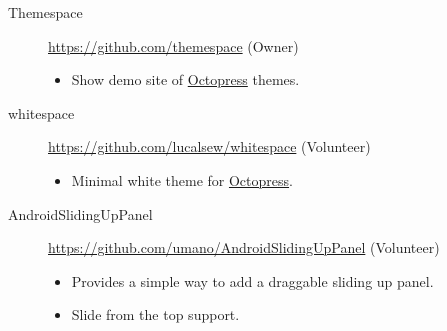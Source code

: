 \documentclass[a4paper,10pt]{article}
\begin{document}
\begin{description}
\begin{itemize}
    \end{itemize}
  \item[Themespace] \url{https://github.com/themespace} (Owner)
    \begin{itemize}
      \item Show demo site of \href{http://octopress.org}{Octopress} themes.
    \end{itemize}
  \item[whitespace] \url{https://github.com/lucalsew/whitespace} (Volunteer)
    \begin{itemize}
      \item Minimal white theme for \href{http://octopress.org}{Octopress}.
    \end{itemize}
  \item[AndroidSlidingUpPanel] \url{https://github.com/umano/AndroidSlidingUpPanel} (Volunteer)
    \begin{itemize}
      \item Provides a simple way to add a draggable sliding up panel.
      \item Slide from the top support.
    \end{itemize}
\end{description}


\end{document}
